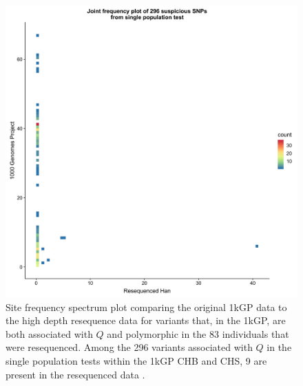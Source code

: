 \documentclass[9pt,lineno]{elife}
\begin{document}
\begin{figure}[h]
\centering
\includegraphics[width=12cm,keepaspectratio]{./Figures/Han_1kGP_SFS_singlePop.jpg}
\caption{Site frequency spectrum plot comparing the original 1kGP data to the high depth resequence data for variants that, in the 1kGP, are both associated with $Q$ and polymorphic in the 83 individuals that were resequenced.
Among the 296 variants associated with $Q$ in the single population tests within the 1kGP CHB and CHS, 9 are present in the resequenced data \citep{Lan2017}.}  
\label{90HanSFS}
\end{figure}
\end{document}
